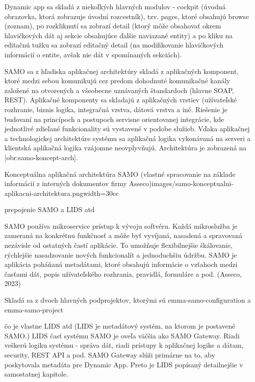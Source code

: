 Dynamic app sa skladá z niekoľkých hlavných modulov - cockpit (úvodná obrazovka, ktorá zobrazuje úvodní rozcestník), tzv. pages, ktoré obsahujú browse (zoznam), po rozkliknutí sa zobrazí detail (ktorý môže obsahovať okrem hlavičkových dát aj sekcie obsahujúce ďalšie naviazané entity) a po kliku na editačnú tužku sa zobrazí editačný detail (na modifikovanie hlavičkových informácií o entite, avšak nie dát v spomínaných sekciách).

SAMO sa z hľadiska aplikačnej architektúry skladá z aplikačných komponent, ktoré medzi sebou komunikujú cez predom dohodnuté komunikačné kanály založené na otvorených a všeobecne uznávaných štandardoch (hlavne SOAP, REST). Aplikačné komponenty sa skladajú z aplikačných vrstiev (užívateľské rozhranie, biznis logika, integračná vrstva, dátová vrstva a iné. Riešenie je budovaní na princípoch a postupoch servisne orientovanej integrácie, kde jednotlivé zdieľané funkcionality sú vystavené v podobe služieb. Vďaka aplikačnej a technologickej architektúre systému sa aplikačná logika vykonávaná na serveri a klientská aplikačná logika vzájomne neovplyvňujú. Architektúra je zobrazená na [obr:samo-koncept-arch].

{Konceptuálna aplikačná architektúra SAMO (vlastné spracovanie na základe informácií z interných dokumentov firmy Asseco)}{images/samo-konceptualni-aplikacni-architektura.png}{width=30cc}

\TODO prepojenie SAMO a LIDS atd

SAMO používa mikroservice prístup k vývoju softvéru. Každá mikroslužba je zameraná na konkrétnu funkčnosť a môže byť vyvíjaná, nasadená a spravovaná nezávisle od ostatných častí aplikácie. To umožňuje flexibilnejšie škálovanie, rýchlejšie nasadzovanie nových funkcionalít a jednoduchšiu údržbu. SAMO je aplikácia poháňaná metadátami, ktoré obsahujú informácie o vzťahoch medzi časťami  dát, popis užívateľského rozhrania, pravidlá, formuláre a pod. \scr(Asseco, 2023) 

\TODO Skladá sa z dvoch hlavných podprojektov, ktorými sú emma-samo-configuration a emma-samo-project


\TODO čo je vlastne LIDS atd (LIDS je metadátový systém, na ktorom je postavené SAMO.)
LIDS časť systému SAMO je oveľa väčšia ako SAMO Gateway. Riadi veškerú logiku systému - správa dát, riadi prístupy k aplikačnej logike a dátam, security, REST API a pod. SAMO Gateway slúži primárne na to, aby poskytovala metadáta pre Dynamic App. Preto je LIDS popísaný detailnejšie v samostatnej kapitole.

